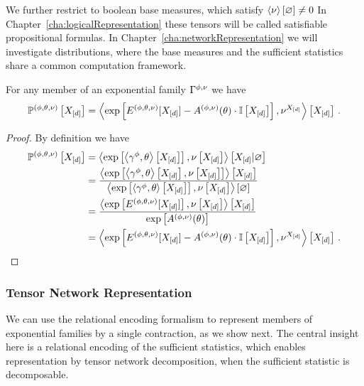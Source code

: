 We further restrict to boolean base measures, which satisfy $\left\langle \nu\right\rangle \left[ \varnothing \right]\neq0$
In Chapter~\ref{cha:logicalRepresentation} these tensors will be called satisfiable propositional formulas.
In Chapter~\ref{cha:networkRepresentation} we will investigate distributions, where the base measures and the sufficient statistics share a common computation framework.

\begin{lemma}\label{lem:energyCumulantRepresentation}
	For any member of an exponential family $\Gamma^{\phi,\nu}$ we have
		\[ \mathbb{P}^{(\phi,\theta,\nu)}\left[X_{[d]}\right] 
		= \left\langle \mathrm{exp}\left[ E^{(\phi,\theta,\nu)}[X_{[d]}] - A^{(\phi,\nu)}(\theta)\cdot \mathbb{I}\left[X_{[d]}\right]\right],\nu^{X_{[d]}}\right\rangle \left[ X_{[d]} \right] \, . \]
\end{lemma}
\begin{proof}
	By definition we have
	\begin{align*}
		\mathbb{P}^{(\phi,\theta,\nu)}\left[X_{[d]}\right] 
		&= \left\langle 
		\mathrm{exp}\left[\left\langle \gamma^{\phi},\theta\right\rangle \left[ X_{[d]} \right]\right],\nu\left[X_{[d]}\right]
		\right\rangle \left[ X_{[d]} | \varnothing \right] \\
		&= \frac{\left\langle \mathrm{exp}\left[\left\langle \gamma^{\phi},\theta\right\rangle \left[ X_{[d]} \right],\nu\left[X_{[d]}\right]\right]\right\rangle \left[ X_{[d]} \right]
			}{\left\langle \mathrm{exp}\left[\left\langle \gamma^{\phi},\theta	\right\rangle \left[ X_{[d]} \right]\right],\nu\left[X_{[d]}\right]\right\rangle \left[ \varnothing \right]} \\
		&=  \frac{
		\left\langle \mathrm{exp}\left[E^{(\phi,\theta,\nu)}[X_{[d]}]\right],\nu\left[X_{[d]}\right]\right\rangle \left[ X_{[d]} \right]
		}{
		\mathrm{exp}\left[A^{(\phi,\nu)}(\theta)\right]
		} \\
		& = \left\langle \mathrm{exp}\left[ E^{(\phi,\theta,\nu)}[X_{[d]}] - A^{(\phi,\nu)}(\theta)\cdot \mathbb{I}\left[X_{[d]}\right]\right],\nu^{X_{[d]}}\right\rangle \left[ X_{[d]} \right] \, . 
	\end{align*}
\end{proof}


\subsubsection{Tensor Network Representation} 

We can use the relational encoding formalism to represent members of exponential families by a single contraction, as we show next.
The central insight here is a relational encoding of the sufficient statistics, which enables representation by tensor network decomposition, when the sufficient statistic is decomposable.

